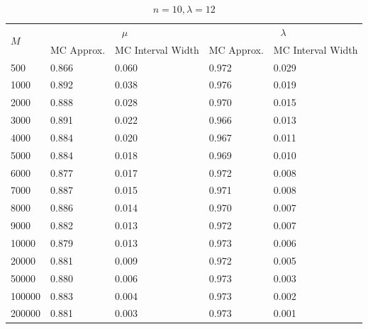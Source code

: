\documentclass{article}
\begin{document}
\begin{table}[!htb]
		\begin{subtable}[b]{\textwidth}
		\centering
		\begin{tabular}{l|ll|ll}
		\toprule
        \multirow{2}{*}{$M$} & \multicolumn{2}{c|}{$\mu$}      & \multicolumn{2}{c}{$\lambda$}  \\ 
                           & MC Approx. & MC Interval Width & MC Approx. & MC Interval Width \\
                           \midrule
        500    &0.866 &0.060 &0.972 &0.029\\
        1000   &0.892 &0.038 &0.976 &0.019\\
        2000   &0.888 &0.028 &0.970 &0.015\\
        3000   &0.891 &0.022 &0.966 &0.013\\
        4000   &0.884 &0.020 &0.967 &0.011\\
        5000   &0.884 &0.018 &0.969 &0.010\\
        6000   &0.877 &0.017 &0.972 &0.008\\
        7000   &0.887 &0.015 &0.971 &0.008\\
        8000   &0.886 &0.014 &0.970 &0.007\\
        9000   &0.882 &0.013 &0.972 &0.007\\
        10000  &0.879 &0.013 &0.973 &0.006\\
        20000  &0.881 &0.009 &0.972 &0.005\\
        50000  &0.880 &0.006 &0.973 &0.003\\
        100000 &0.883 &0.004 &0.973 &0.002\\
        200000 &0.881 &0.003 &0.973 &0.001\\
       \bottomrule
       \end{tabular}
       \caption{$n = 10, \lambda = 12$}
	   \end{subtable}%

	    \end{table}
\end{document}
